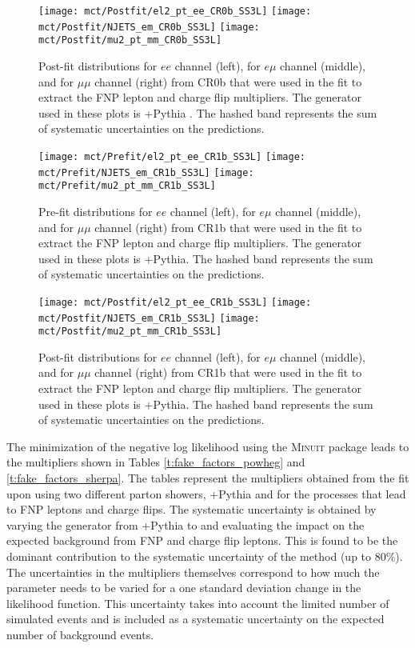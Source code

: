 \begin{figure}[!htb]
  \texttt{[image: mct/Postfit/el2\_pt\_ee\_CR0b\_SS3L]}
  \texttt{[image: mct/Postfit/NJETS\_em\_CR0b\_SS3L]}
  \texttt{[image: mct/Postfit/mu2\_pt\_mm\_CR0b\_SS3L]}
\caption{
Post-fit distributions for  $ee$ channel (left),  for  $e\mu$ channel (middle), and  for  $\mu\mu$ channel (right) from CR0b that were used in the fit to extract the FNP lepton and charge flip multipliers.
The generator used in these plots is  \POWHEGBOX+Pythia . The hashed band represents the sum of systematic uncertainties on the predictions.
\label{f:postfit_CR0b}
}
\end{figure}

 \begin{figure}[!htb]
   \texttt{[image: mct/Prefit/el2\_pt\_ee\_CR1b\_SS3L]}
   \texttt{[image: mct/Prefit/NJETS\_em\_CR1b\_SS3L]}
   \texttt{[image: mct/Prefit/mu2\_pt\_mm\_CR1b\_SS3L]}
 \caption{
 Pre-fit distributions for  $ee$ channel (left), for  $e\mu$ channel (middle), and  for  $\mu\mu$ channel (right) from CR1b that were used in the fit to extract the FNP lepton and charge flip multipliers.
The generator used in these plots is  \POWHEGBOX+Pythia. The hashed band represents the sum of systematic uncertainties on the predictions.
 \label{f:prefit_CR1b}
 }
 \end{figure}

\begin{figure}[!htb]
  \texttt{[image: mct/Postfit/el2\_pt\_ee\_CR1b\_SS3L]}
  \texttt{[image: mct/Postfit/NJETS\_em\_CR1b\_SS3L]}
  \texttt{[image: mct/Postfit/mu2\_pt\_mm\_CR1b\_SS3L]}
\caption{
Post-fit distributions for  $ee$ channel (left), for  $e\mu$ channel (middle), and  for  $\mu\mu$ channel (right) from CR1b that were used in the fit to extract the FNP lepton and charge flip multipliers.
The generator used in these plots is  \POWHEGBOX+Pythia. The hashed band represents the sum of systematic uncertainties on the predictions.
\label{f:postfit_CR1b}
}
\end{figure}

The minimization of the negative log likelihood using the \textsc{Minuit} package leads 
to the multipliers shown in Tables \ref{t:fake_factors_powheg} and \ref{t:fake_factors_sherpa}.
The tables represent the multipliers obtained from the fit upon using two different parton showers, \POWHEGBOX+Pythia and \SHERPA 
for the processes that lead to FNP leptons and charge flips.
The systematic uncertainty is obtained by varying the 
generator from \POWHEGBOX+Pythia to \SHERPA and evaluating the impact on the expected background from FNP and charge flip leptons. 
This is found to be the dominant contribution to the systematic uncertainty of the method (up to 80\%).
The uncertainties in the multipliers themselves correspond to how much the parameter needs to be varied for 
a one standard deviation change in the likelihood function. This uncertainty takes into account the limited number of simulated events and is included as a 
systematic uncertainty on the expected number of background events. 

